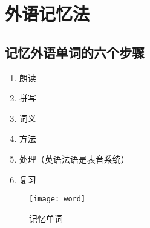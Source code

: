 
\chapter{外语记忆法}


\section{记忆外语单词的六个步骤}

\begin{enumerate}
\item 朗读
\item 拼写
\item 词义
\item 方法
\item 处理（英语法语是表音系统）
\item 复习
\end{enumerate}


\begin{figure}[H]
  \centering
  \texttt{[image: word]}
  \caption{记忆单词}
\end{figure}




